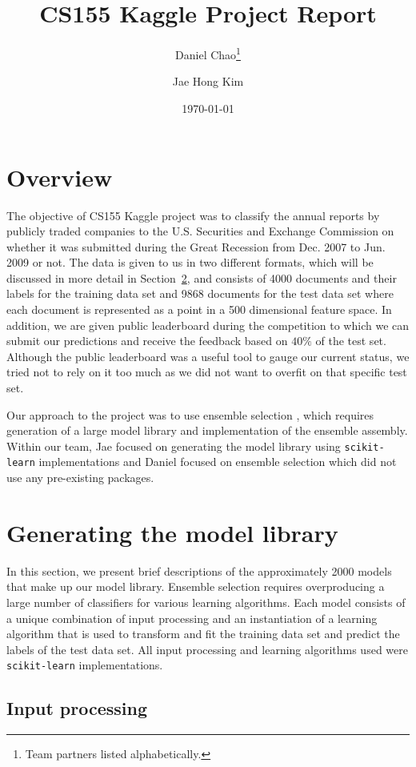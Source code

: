 \documentclass{article}
\title{CS155 Kaggle Project Report}
\author{Daniel Chao\thanks{Team partners listed alphabetically.} \and Jae Hong Kim\footnotemark[1]}
\date{\today}
\renewcommand{\(}{\left(}
\renewcommand{\)}{\right)}
\begin{document}
\maketitle 
\tableofcontents 

\section{Overview}
The objective of CS155 Kaggle project was to classify the annual reports by publicly traded companies to the U.S. Securities and Exchange Commission on whether it was submitted during the Great Recession from Dec. 2007 to Jun. 2009 or not.  The data is given to us in two different formats, which will be discussed in more detail in Section~\ref{sec:models}, and consists of 4000 documents and their labels for the training data set and 9868 documents for the test data set where each document is represented as a point in a 500 dimensional feature space.  In addition, we are given public leaderboard during the competition to which we can submit our predictions and receive the feedback based on $40\%$ of the test set.  Although the public leaderboard was a useful tool to gauge our current status, we tried not to rely on it too much as we did not want to overfit on that specific test set.  

Our approach to the project was to use ensemble selection \cite{caruana04}, which requires generation of a large model library and implementation of the ensemble assembly.  Within our team, Jae focused on generating the model library using \texttt{scikit-learn} implementations and Daniel focused on ensemble selection which did not use any pre-existing packages.

\section{Generating the model library} \label{sec:models}
In this section, we present brief descriptions of the approximately 2000 models that make up our model library.  Ensemble selection requires overproducing a large number of classifiers for various learning algorithms.  Each model consists of a unique combination of input processing and an instantiation of a learning algorithm that is used to transform and fit the training data set and predict the labels of the test data set.  All input processing and learning algorithms used were \texttt{scikit-learn} implementations.  

  \subsection{Input processing}
\end{document}
